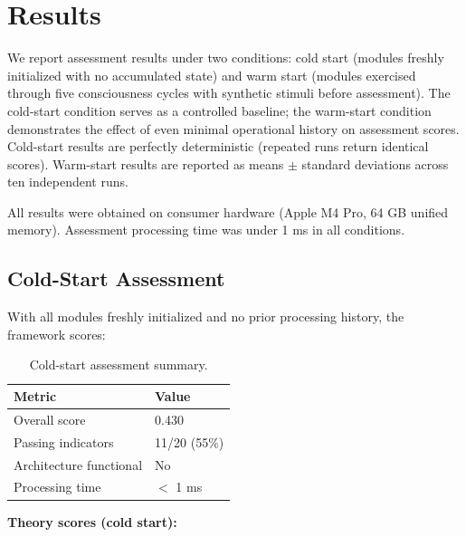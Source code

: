 \section{Results}
\label{sec:results}

We report assessment results under two conditions: cold start (modules freshly initialized with no accumulated state) and warm start (modules exercised through five consciousness cycles with synthetic stimuli before assessment). The cold-start condition serves as a controlled baseline; the warm-start condition demonstrates the effect of even minimal operational history on assessment scores. Cold-start results are perfectly deterministic (repeated runs return identical scores). Warm-start results are reported as means $\pm$ standard deviations across ten independent runs.

All results were obtained on consumer hardware (Apple M4 Pro, 64 GB unified memory). Assessment processing time was under 1 ms in all conditions.

\subsection{Cold-Start Assessment}
\label{sec:cold-start}

With all modules freshly initialized and no prior processing history, the framework scores:

\begin{table}[t]
\centering
\begin{tabular}{ll}
\toprule
Metric & Value \\
\midrule
Overall score & 0.430 \\
Passing indicators & 11/20 (55\%) \\
Architecture functional & No \\
Processing time & $<$ 1 ms \\
\bottomrule
\end{tabular}
\caption{Cold-start assessment summary.}
\label{tab:cold-start-summary}
\end{table}

\textbf{Theory scores (cold start):}

